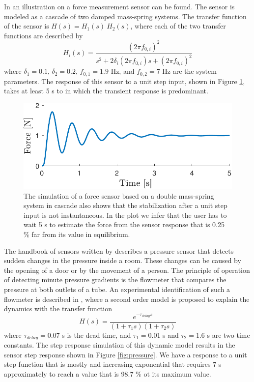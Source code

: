 In \citet{Eichstadt12} an illustration on a force measurement sensor can be found. 
The sensor is modeled as a cascade of two damped mass-spring systems. 
The transfer function of the sensor is $H(s) = H_1(s) \ H_2(s)$, where each of the two transfer functions are described by
\begin{equation} H_i(s) = \dfrac{\left( 2 \pi f_{0,i}\right)^2}{s^2  + 2 \delta_i \left( 2 \pi f_{0,i}\right) s  +  \left( 2 \pi f_{0,i}\right)^2} 
\end{equation}  
where $\delta_1 = 0.1$, $\delta_2 = 0.2$, $f_{0,1} = 1.9$ Hz, and $f_{0,2} = 7$ Hz are the system parameters.
The response of this sensor to a unit step input, shown in Figure \ref{fig:force}, takes at least 5 s to in which the transient response is predominant.  

\begin{figure}[!htbp]
\centering
\includegraphics[width=0.69\columnwidth]{./ChapterIntroduction/fig/Fig_4.pdf} 
\caption{ \label{fig:force} 
\color{blue} The simulation of a force sensor based on a double mass-spring system in cascade also shows that the stabilization after a unit step input is not instantaneous. In the plot we infer that the user has to wait 5 s to estimate the force from the sensor response that is 0.25 \% far from its value in equilibrium. \color{black}  }
\end{figure}

The handbook of sensors written by \citet{Fraden16Book} describes a pressure sensor that detects sudden changes in the pressure inside a room.
These changes can be caused by the opening of a door or by the movement of a person.
The principle of operation of detecting minute pressure gradients is the flowmeter that compares the pressure at both outlets of a tube.   
An experimental identification of such a flowmeter is described in \citet{Wiklund02}, where a second order model is proposed to explain the dynamics with the transfer function
\begin{equation} H(s) = \dfrac{ e^{-\tau_{delay}s}}{\left( 1 +  \tau_1 s \right) \left( 1 +  \tau_2 s \right)} 
\end{equation}  
where $\tau_{delay} = 0.07$ s is the dead time, and $\tau_{1} = 0.01$ s and $\tau_{2} = 1.6$ s are two time constants.
The step response simulation of this dynamic model results in the sensor step response shown in Figure \ref{fig:pressure}.  
We have a response to a unit step function that is mostly and increasing exponential that requires 7 s approximately to reach a value that is 98.7 \% ot its maximum value.

